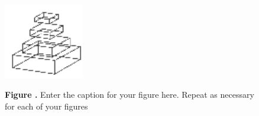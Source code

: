 \documentclass{frontiersSCNS} %
\begin{document}
\begin{figure}
\begin{center}
\includegraphics[width=3.5cm]{logo2}%
\end{center}
 \textbf{\label{fig:02} Figure .}{ Enter the caption for your figure here.  Repeat as  necessary for each of your figures }
\end{figure}

%




\end{document}

